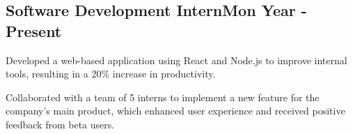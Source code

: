 \documentclass[a4paper,12pt]{article}
\begin{document}


\vspace*{10pt}
\subsection{{Software Development Intern}\hfill Mon Year - Present}
\begin{zitemize}
\vspace*{-5pt}
\item Developed a web-based application using React and Node.js to improve internal tools, resulting in a 20\% increase in productivity.
\item Collaborated with a team of 5 interns to implement a new feature for the company's main product, which enhanced user experience and received positive feedback from beta users.
\end{zitemize}
\end{document}
